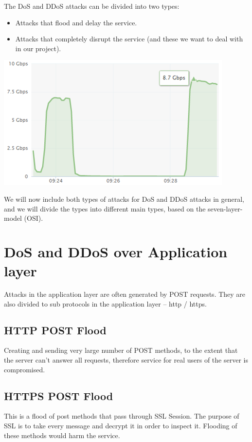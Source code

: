 \documentclass{report}
\begin{document}
\hfill \break The DoS and DDoS attacks can be divided into two types: 
\begin{itemize}
\item 	Attacks that flood and delay the service.
\item	Attacks that completely disrupt the service (and these we want to deal with in our project).

\end{itemize}
    \begin{center}
        \includegraphics{ddos-attack-traffic-gbps}
    \end{center}


 \hfill \break
 \hfill \break We will now include both types of attacks for DoS and DDoS attacks in general, and we will divide the types into different main types, based on the seven-layer-model (OSI).



\section {DoS and DDoS over Application layer} 
 \hfill \break Attacks in the application layer are often generated by POST requests. They are also divided to sub protocols in the application layer – http / https.

\subsection {HTTP POST Flood} 
Creating and sending very large number of POST methods, to the extent that the server can't answer all requests, therefore service for real users of the server is compromised.

\subsection{HTTPS POST Flood} This is a flood of post methods that pass through SSL Session. The purpose of SSL is to take every message and decrypt it in order to inspect it. Flooding of these methods would harm the service.
\end{document}
